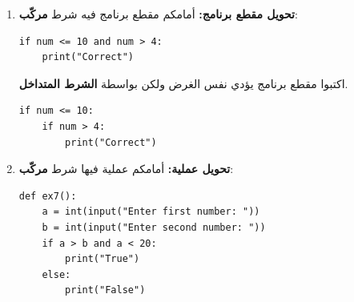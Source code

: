 \documentclass[14pt]{extarticle}
\begin{document}
\begin{enumerate}[resume, label=\textbf{تمرين \arabic*:}, wide=0pt, itemsep=2.2em]
\begin{boxSolution}[بديل]
\begin{english}
\begin{verbatim}
def multiple_of_six():
    num = int(input("Enter a number: "))

    if num % 6 == 0:
        print(num, "is a multiple of 6")
    else:
        print(num, "is not a multiple of 6")

# Call the function
multiple_of_six()
\end{verbatim}
\end{english}
\end{boxSolution}

\fi
\filbreak

\item \textbf{تحويل مقطع برنامج:} أمامكم مقطع برنامج فيه شرط \textbf{مركّب}:

\begin{boxCode}
\begin{english}
\begin{verbatim}
if num <= 10 and num > 4:
    print("Correct")
\end{verbatim}
\end{english}
\end{boxCode}

اكتبوا مقطع برنامج يؤدي نفس الغرض ولكن بواسطة \textbf{الشرط المتداخل}.

\ifwithsols
\begin{boxSolution}
\begin{english}
\begin{verbatim}
if num <= 10:
    if num > 4:
        print("Correct")
\end{verbatim}
\end{english}
\end{boxSolution}

\fi
\filbreak

\item \textbf{تحويل عملية:} أمامكم عملية فيها شرط \textbf{مركّب}:

\begin{boxCode}
\begin{english}
\begin{verbatim}
def ex7():
    a = int(input("Enter first number: "))
    b = int(input("Enter second number: "))
    if a > b and a < 20:
        print("True")
    else:
        print("False")


\end{verbatim}
\end{english}
\end{boxCode}
\end{enumerate}
\end{document}
